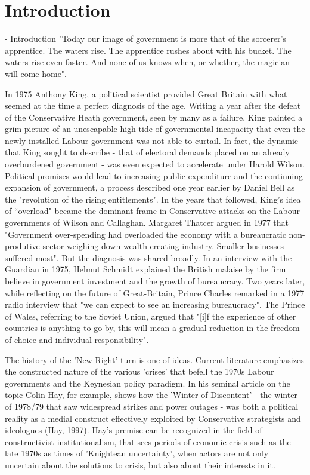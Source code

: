 \documentclass{article}
\begin{document}
\section{Introduction}

- Introduction
"Today our image of government is more that of the sorcerer’s apprentice. The waters rise. The apprentice rushes about with his bucket. The waters rise even faster. And none of us knows when, or whether, the magician will come home".

In 1975 Anthony King, a political scientist provided Great Britain with what seemed at the time a perfect diagnosis of the age. Writing a year after the defeat of the Conservative Heath government, seen by many as a failure, King painted a grim picture of an unescapable high tide of governmental incapacity that even the newly installed Labour government was not able to curtail. In fact, the dynamic that King sought to describe  - that of electoral demands placed on an already overburdened government - was even expected to accelerate under Harold Wilson. Political promises would lead to increasing public expenditure and the continuing expansion of government, a process described one year earlier by Daniel Bell as the "revolution of the rising entitlements". In the years that followed, King's idea of ``overload" became the dominant frame in Conservative attacks on the Labour governments of Wilson and Callaghan. Margaret Thatcer argued in 1977 that "Government over-spending had overloaded the economy with a bureaucratic non-produtive sector weighing down wealth-creating industry. Smaller businesses suffered most". But the diagnosis was shared broadly. In an interview with the Guardian in 1975, Helmut Schmidt explained the British malaise by the firm believe in government investment and the growth of bureaucracy. Two years later, while reflecting on the future of Great-Britain, Prince Charles remarked in a 1977 radio interview that "we can expect to see an increasing bureaucracy". The Prince of Wales, referring to the Soviet Union, argued that "[i]f the experience of other countries is anything to go by, this will mean a gradual reduction in the freedom of choice and individual responsibility". 

The history of the 'New Right' turn is one of ideas. Current literature emphasizes the constructed nature of the various 'crises' that befell the 1970s Labour governments and the Keynesian policy paradigm. In his seminal article on the topic Colin Hay, for example, shows how the 'Winter of Discontent' - the winter of 1978/79 that saw widespread strikes and power outages - was both a political reality as a medial construct effectively exploited by Conservative strategists and ideologues (Hay, 1997). Hay's premise can be recognized in the field of constructivist institutionalism, that sees periods of economic crisis such as the late 1970s as times of 'Knightean uncertainty', when actors are not only uncertain about the solutions to crisis, but also about their interests in it.
\end{document}
